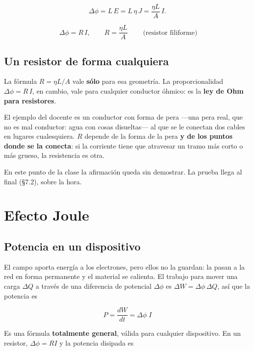 \documentclass[12pt,a4paper]{article}
\begin{document}
\[
\Delta\phi = L\,E = L\,\eta\,J = \frac{\eta L}{A}\,I .
\]

\begin{keybox}
\[
\boxed{\ \Delta\phi = R\,I, \qquad R = \frac{\eta L}{A}\ }
\qquad \text{(resistor filiforme)}
\]
\end{keybox}

\subsection{Un resistor de forma cualquiera}

La fórmula $R = \eta L/A$ vale \textbf{sólo} para esa geometría. La proporcionalidad
$\Delta\phi = R\,I$, en cambio, vale para cualquier conductor óhmico: es la
\textbf{ley de Ohm para resistores}.

El ejemplo del docente es un conductor con forma de pera ---una pera real, que no
es mal conductor: agua con cosas disueltas--- al que se le conectan dos cables en
lugares cualesquiera. $R$ depende de la forma de la pera \textbf{y de los puntos donde
se la conecta}: si la corriente tiene que atravesar un tramo más corto o más
grueso, la resistencia es otra.

\begin{notebox}
En este punto de la clase la afirmación queda sin demostrar. La prueba llega
al final (§7.2), sobre la hora.
\end{notebox}

\section{Efecto Joule}

\subsection{Potencia en un dispositivo}

El campo aporta energía a los electrones, pero ellos no la guardan: la pasan a
la red en forma permanente y el material se calienta. El trabajo para mover una
carga $\Delta Q$ a través de una diferencia de potencial $\Delta\phi$ es
$\Delta W = \Delta\phi\,\Delta Q$, así que la potencia es

\begin{keybox}
\[
\boxed{\ P = \frac{dW}{dt} = \Delta\phi\;I\ }
\]
\end{keybox}

Es una fórmula \textbf{totalmente general}, válida para cualquier dispositivo. En un
resistor, $\Delta\phi = R I$ y la potencia disipada es
\end{document}
